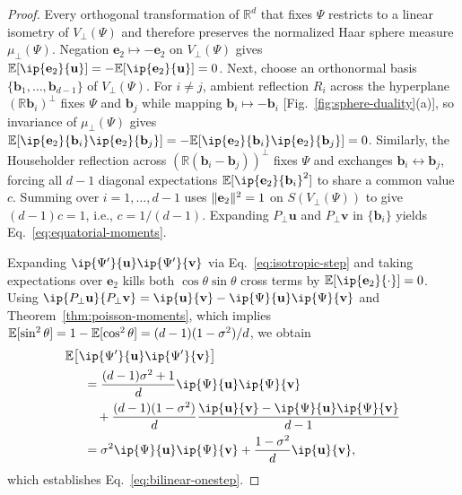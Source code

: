 \begin{proof}
Every orthogonal transformation of $\mathbb{R}^d$ that fixes $\Psi$ restricts to a linear isometry of $V_\perp(\Psi)$ and therefore preserves the normalized Haar sphere measure $\mu_\perp(\Psi)$. Negation $\mathbf{e}_2 \mapsto -\mathbf{e}_2$ on $V_\perp(\Psi)$ gives $\E[\ip{\mathbf{e}_2}{\mathbf{u}}] = -\E[\ip{\mathbf{e}_2}{\mathbf{u}}] = 0$. Next, choose an orthonormal basis $\{\mathbf{b}_1, \dots, \mathbf{b}_{d-1}\}$ of $V_\perp(\Psi)$. For $i \ne j$, ambient reflection $R_i$ across the hyperplane $(\mathbb{R}\mathbf{b}_i)^\perp$ fixes $\Psi$ and $\mathbf{b}_j$ while mapping $\mathbf{b}_i \mapsto -\mathbf{b}_i$ [Fig.~\ref{fig:sphere-duality}(a)], so invariance of $\mu_\perp(\Psi)$ gives $\E[\ip{\mathbf{e}_2}{\mathbf{b}_i}\ip{\mathbf{e}_2}{\mathbf{b}_j}] = -\E[\ip{\mathbf{e}_2}{\mathbf{b}_i}\ip{\mathbf{e}_2}{\mathbf{b}_j}] = 0$. Similarly, the Householder reflection across $(\mathbb{R}(\mathbf{b}_i - \mathbf{b}_j))^\perp$ fixes $\Psi$ and exchanges $\mathbf{b}_i \leftrightarrow \mathbf{b}_j$, forcing all $d - 1$ diagonal expectations $\E[\ip{\mathbf{e}_2}{\mathbf{b}_i}^2]$ to share a common value $c$. Summing over $i = 1, \dots, d - 1$ uses $\lVert\mathbf{e}_2\rVert^2 = 1$ on $S(V_\perp(\Psi))$ to give $(d - 1)c = 1$, i.e., $c = 1/(d - 1)$. Expanding $P_\perp \mathbf{u}$ and $P_\perp \mathbf{v}$ in $\{\mathbf{b}_i\}$ yields Eq.~\eqref{eq:equatorial-moments}.

Expanding $\ip{\Psi'}{\mathbf{u}}\ip{\Psi'}{\mathbf{v}}$ via Eq.~\eqref{eq:isotropic-step} and taking expectations over $\mathbf{e}_2$ kills both $\cos\theta\sin\theta$ cross terms by $\E[\ip{\mathbf{e}_2}{\cdot}] = 0$. Using $\ip{P_\perp \mathbf{u}}{P_\perp \mathbf{v}} = \ip{\mathbf{u}}{\mathbf{v}} - \ip{\Psi}{\mathbf{u}}\ip{\Psi}{\mathbf{v}}$ and Theorem~\ref{thm:poisson-moments}, which implies $\mathbb{E}[\sin^2\theta] = 1 - \mathbb{E}[\cos^2\theta] = (d - 1)(1 - \sigma^2)/d$, we obtain
\begin{align}
\MoveEqLeft[1.5] \E\bigl[\ip{\Psi'}{\mathbf{u}}\ip{\Psi'}{\mathbf{v}}\bigr] \nonumber \\
&= \frac{(d - 1)\sigma^2 + 1}{d}\ip{\Psi}{\mathbf{u}}\ip{\Psi}{\mathbf{v}} \nonumber \\
&\quad + \frac{(d - 1)(1 - \sigma^2)}{d}\frac{\ip{\mathbf{u}}{\mathbf{v}} - \ip{\Psi}{\mathbf{u}}\ip{\Psi}{\mathbf{v}}}{d - 1} \nonumber \\
&= \sigma^2 \ip{\Psi}{\mathbf{u}}\ip{\Psi}{\mathbf{v}} + \frac{1 - \sigma^2}{d}\ip{\mathbf{u}}{\mathbf{v}},
\label{eq:d-minus-1-cancel}
\end{align}
which establishes Eq.~\eqref{eq:bilinear-onestep}.
\end{proof}

